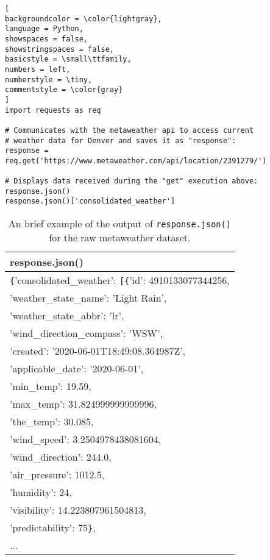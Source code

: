 \documentclass[]{article}
\newcommand{\code}[1]{\colorbox{light-gray}{\texttt{#1}}}
\begin{document}
\begin{lstlisting}[
backgroundcolor = \color{lightgray},
language = Python,
showspaces = false,
showstringspaces = false,
basicstyle = \small\ttfamily,
numbers = left,
numberstyle = \tiny,
commentstyle = \color{gray}
]
import requests as req

# Communicates with the metaweather api to access current 
# weather data for Denver and saves it as "response":
response = req.get('https://www.metaweather.com/api/location/2391279/')

# Displays data received during the "get" execution above:
response.json()
response.json()['consolidated_weather']
\end{lstlisting}
\pagebreak
\begin{table}[!ht]
	\begin{center}
		\caption{An brief example of the output of \code{response.json()} for the raw metaweather dataset.}
		\label{tab:table1}
		\begin{tabular}{|l|} 
			\hline
			\textbf{response.json()} \\
			\hline

			\verb|{|'consolidated\_weather': \verb|[{|'id': 4910133077344256,\\
					'weather\_state\_name': 'Light Rain',\\
					'weather\_state\_abbr': 'lr',\\
					'wind\_direction\_compass': 'WSW',\\
					'created': '2020-06-01T18:49:08.364987Z',\\
					'applicable\_date': '2020-06-01',\\
					'min\_temp': 19.59,\\
					'max\_temp': 31.824999999999996,\\
					'the\_temp': 30.085,\\
					'wind\_speed': 3.2504978438081604,\\
					'wind\_direction': 244.0,\\
					'air\_pressure': 1012.5,\\
					'humidity': 24,\\
					'visibility': 14.223807961504813,\\
					'predictability': 75\verb|}|,\\
					...\\
				\hline
		\end{tabular}
	\end{center}
\end{table}
\end{document}
